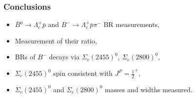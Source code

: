 \documentclass[10pt, aspectratio=169]{beamer}
\begin{document}
\begin{frame}[label=conclusion]%
  \frametitle{Conclusions}
  \Large

  \begin{itemize}
    \item $\overline{B}{}^0 \to \Lambda_c^+ \bar{p}$ and
      $B^- \to \Lambda_c^+ \bar{p} \pi^-$ BR measurements,
    \item Measurement of their ratio,
    \item BRs of $B^-$ decays via $\Sigma_c(2455)^0$, $\Sigma_c(2800)^0$,
    \item $\Sigma_c(2455)^0$ spin consistent with $J^P = \frac{1}{2}^+$,
    \item $\Sigma_c(2455)^0$ and $\Sigma_c(2800)^0$ masses and widths measured.
  \end{itemize}
\end{frame}%
\end{document}
